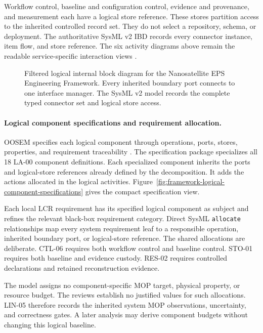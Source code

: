 \documentclass[11pt,a4paper]{article}
\begin{document}
Workflow control, baseline and configuration control, evidence and provenance, and measurement each have a logical store reference. These stores partition access to the inherited controlled record set. They do not select a repository, schema, or deployment. The authoritative SysML v2 IBD records every connector instance, item flow, and store reference. The six activity diagrams above remain the readable service-specific interaction views \citep[Sec.~17.3.4]{friedenthal2014practical}.

\begin{figure}[H]
    \centering
    \resizebox{\linewidth}{!}{}
    \caption{Filtered logical internal block diagram for the Nanosatellite EPS Engineering Framework. Every inherited boundary port connects to one interface manager. The SysML v2 model records the complete typed connector set and logical store access.}
    \label{fig:framework-logical-interconnections}
\end{figure}

\paragraph{Logical component specifications and requirement allocation.}
OOSEM specifies each logical component through operations, ports, stores, properties, and requirement traceability \citep[Sec.~17.3.4]{friedenthal2014practical}. The specification package specializes all 18 LA-00 component definitions. Each specialized component inherits the ports and logical-store references already defined by the decomposition. It adds the actions allocated in the logical activities. Figure~\ref{fig:framework-logical-component-specifications} gives the compact specification view.

Each local LCR requirement has its specified logical component as subject and refines the relevant black-box requirement category. Direct SysML \texttt{allocate} relationships map every system requirement leaf to a responsible operation, inherited boundary port, or logical-store reference. The shared allocations are deliberate. CTL-06 requires both workflow control and baseline control. STO-01 requires both baseline and evidence custody. RES-02 requires controlled declarations and retained reconstruction evidence.

The model assigns no component-specific MOP target, physical property, or resource budget. The reviews establish no justified values for such allocations. LIN-05 therefore records the inherited system MOP observations, uncertainty, and correctness gates. A later analysis may derive component budgets without changing this logical baseline.
\end{document}
